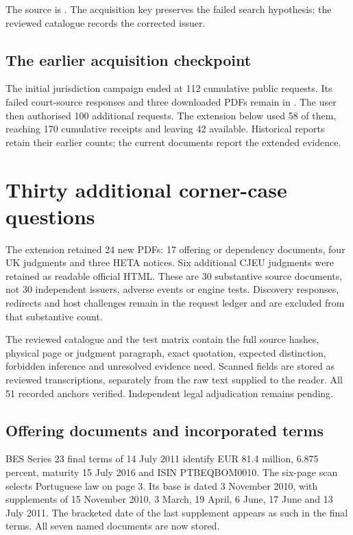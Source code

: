 \documentclass[12pt,a4paper,oneside,openany]{book}
\begin{document}
The source is
.
The acquisition key preserves the failed search hypothesis; the reviewed
catalogue records the corrected issuer.

\subsection{The earlier acquisition checkpoint}

The initial jurisdiction campaign ended at 112 cumulative public requests.
Its failed court-source responses and three downloaded PDFs remain in
. The user then authorised
100 additional requests. The extension below used 58 of them, reaching
170 cumulative receipts and leaving 42 available. Historical reports retain
their earlier counts; the current documents report the extended evidence.

\section{Thirty additional corner-case questions}
\label{app:corner-cases-2026}

The extension retained 24 new PDFs: 17 offering or dependency documents,
four UK judgments and three HETA notices. Six additional CJEU judgments
were retained as readable official HTML. These are 30 substantive source
documents, not 30 independent issuers, adverse events or engine tests.
Discovery responses, redirects and host challenges remain in the request
ledger and are excluded from that substantive count.

The reviewed catalogue and the test matrix contain the full source hashes,
physical page or judgment paragraph, exact quotation, expected distinction,
forbidden inference and unresolved evidence need. Scanned fields are stored
as reviewed transcriptions, separately from the raw text supplied to the
reader. All 51 recorded anchors verified. Independent legal adjudication
remains pending.

\subsection{Offering documents and incorporated terms}

BES Series 23 final terms of 14 July 2011 identify EUR 81.4 million,
6.875 percent, maturity 15 July 2016 and ISIN PTBEQBOM0010.
The six-page scan selects Portuguese law on page 3.
Its base is dated 3 November 2010, with supplements of 15 November 2010,
3 March, 19 April, 6 June, 17 June and 13 July 2011.
The bracketed date of the last supplement appears as such in the final terms.
All seven named documents are now stored.
\end{document}
